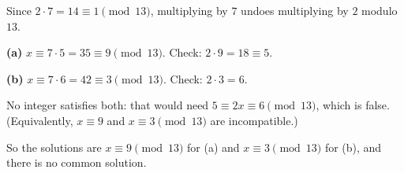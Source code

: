 Since $2\cdot7=14\equiv1\pmod{13}$, multiplying by $7$ undoes multiplying by $2$ modulo $13$.

\textbf{(a)} $x\equiv7\cdot5=35\equiv9\pmod{13}$. Check: $2\cdot9=18\equiv5$.

\textbf{(b)} $x\equiv7\cdot6=42\equiv3\pmod{13}$. Check: $2\cdot3=6$.

No integer satisfies both: that would need $5\equiv2x\equiv6\pmod{13}$, which is false. (Equivalently, $x\equiv9$ and $x\equiv3\pmod{13}$ are incompatible.)

So the solutions are $\boxed{x\equiv9\pmod{13}}$ for (a) and $\boxed{x\equiv3\pmod{13}}$ for (b), and there is no common solution.
